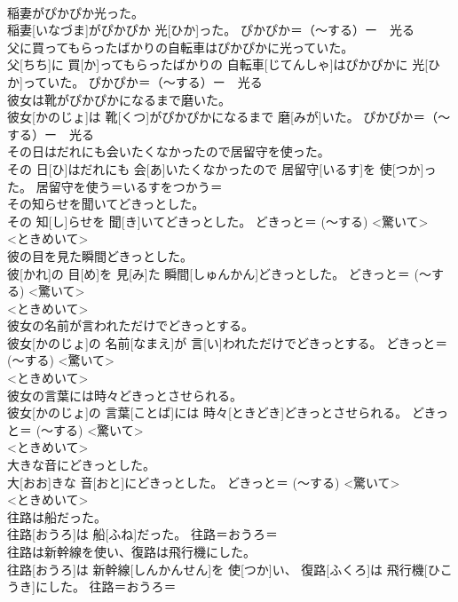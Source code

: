 \documentclass[8pt]{extreport}
\begin{document}
\begin{CJK}{UTF8}{min}
{\\	稲妻がぴかぴか光った。	
\\	稲妻[いなづま]がぴかぴか 光[ひか]った。	ぴかぴか＝（〜する）ー　光る
\\	父に買ってもらったばかりの自転車はぴかぴかに光っていた。	
\\	父[ちち]に 買[か]ってもらったばかりの 自転車[じてんしゃ]はぴかぴかに 光[ひか]っていた。	ぴかぴか＝（〜する）ー　光る
\\	彼女は靴がぴかぴかになるまで磨いた。	
\\	彼女[かのじょ]は 靴[くつ]がぴかぴかになるまで 磨[みが]いた。	ぴかぴか＝（〜する）ー　光る
\\	その日はだれにも会いたくなかったので居留守を使った。	
\\	その 日[ひ]はだれにも 会[あ]いたくなかったので 居留守[いるす]を 使[つか]った。	居留守を使う＝いるすをつかう＝ 
\\	その知らせを聞いてどきっとした。	
\\	その 知[し]らせを 聞[き]いてどきっとした。	どきっと＝ (〜する) <驚いて> 
\\	<ときめいて> 
\\	彼の目を見た瞬間どきっとした。	
\\	彼[かれ]の 目[め]を 見[み]た 瞬間[しゅんかん]どきっとした。	どきっと＝ (〜する) <驚いて> 
\\	<ときめいて> 
\\	彼女の名前が言われただけでどきっとする。	
\\	彼女[かのじょ]の 名前[なまえ]が 言[い]われただけでどきっとする。	どきっと＝ (〜する) <驚いて> 
\\	<ときめいて> 
\\	彼女の言葉には時々どきっとさせられる。	
\\	彼女[かのじょ]の 言葉[ことば]には 時々[ときどき]どきっとさせられる。	どきっと＝ (〜する) <驚いて> 
\\	<ときめいて> 
\\	大きな音にどきっとした。	
\\	大[おお]きな 音[おと]にどきっとした。	どきっと＝ (〜する) <驚いて> 
\\	<ときめいて> 
\\	往路は船だった。	
\\	往路[おうろ]は 船[ふね]だった。	往路＝おうろ＝ 
\\	往路は新幹線を使い、復路は飛行機にした。	
\\	往路[おうろ]は 新幹線[しんかんせん]を 使[つか]い、 復路[ふくろ]は 飛行機[ひこうき]にした。	往路＝おうろ＝ 
}
\end{CJK}
\end{document}

